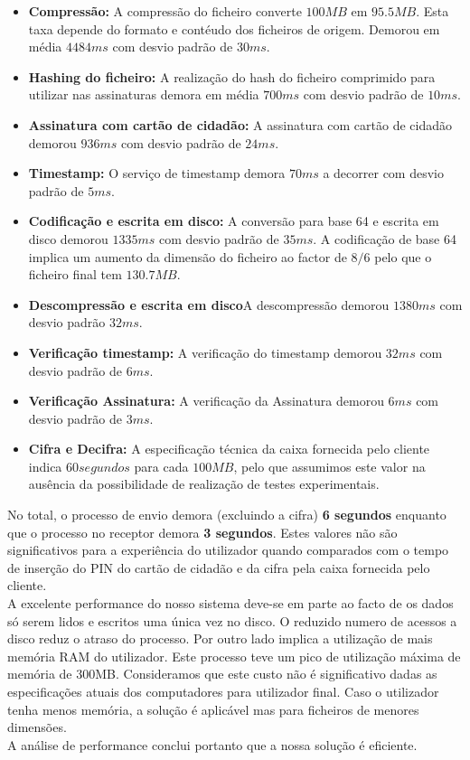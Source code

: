 \begin{itemize}
  \item \textbf{Compressão: }A compressão do ficheiro converte $100MB$ em $95.5MB$. Esta taxa depende do formato e contéudo dos ficheiros de origem. Demorou em média $4484ms$ com desvio padrão de $30ms$. 
  \item \textbf{Hashing do ficheiro: } A realização do hash do ficheiro comprimido para utilizar nas assinaturas demora em média $700ms$ com desvio padrão de $10ms$.
  \item \textbf{Assinatura com cartão de cidadão:} A assinatura com cartão de cidadão demorou $936ms$ com desvio padrão de $24ms$. 
 \item \textbf{Timestamp: }O serviço de timestamp demora $70ms$ a decorrer com desvio padrão de $5ms$.
\item \textbf{Codificação e escrita em disco: }A conversão para base 64 e escrita em disco demorou $1335ms$ com desvio padrão de $35ms$. A codificação de base 64 implica um aumento da dimensão do ficheiro ao factor de $8/6$ pelo que o ficheiro final tem $130.7MB$.
\item  \textbf{Descompressão e escrita em disco}A descompressão demorou $1380ms$ com desvio padrão $32ms$.
\item \textbf{Verificação timestamp: }A verificação do timestamp demorou $32ms$ com desvio padrão de $6ms$.
\item  \textbf{Verificação Assinatura: } A verificação da Assinatura demorou $6ms$ com desvio padrão de $3ms$.
\item \textbf{Cifra e Decifra: } A especificação técnica da caixa fornecida pelo 
cliente indica $60 segundos$ para cada $100MB$, pelo que assumimos este valor na 
ausência da possibilidade de realização de testes experimentais.
\end{itemize}
No total, o processo de envio demora (excluindo a cifra) \textbf{6 segundos} enquanto que 
o processo no receptor demora \textbf{3 segundos}. Estes valores não são significativos para a 
experiência do utilizador quando comparados com o tempo de inserção do PIN do 
cartão de cidadão e da cifra pela caixa fornecida pelo cliente.\\
A excelente performance do nosso sistema deve-se em parte ao facto de os dados só serem lidos e escritos uma única vez no disco. 
O reduzido numero de acessos a disco reduz o atraso do processo. Por outro lado implica a utilização de mais memória RAM do utilizador. Este processo teve um pico de utilização máxima de memória de 300MB. Consideramos que este custo não é significativo dadas as especificações atuais dos computadores para utilizador final. Caso o utilizador tenha menos memória, a solução é aplicável mas  para ficheiros de menores dimensões.\\
A análise de performance conclui portanto que a nossa solução é eficiente.\\

